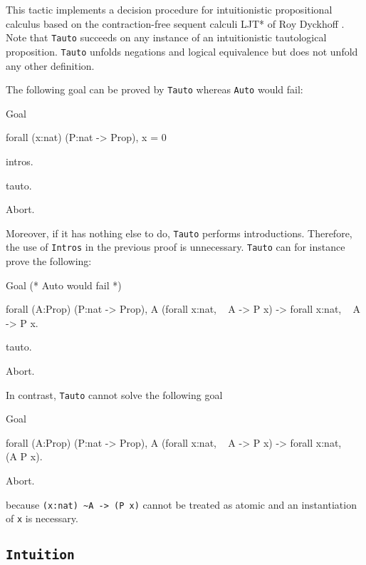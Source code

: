 This tactic implements a decision procedure for intuitionistic propositional
calculus based on the contraction-free sequent calculi LJT* of Roy Dyckhoff
\cite{Dyc92}. Note that {\tt Tauto} succeeds on any instance of an
intuitionistic tautological proposition. {\tt Tauto} unfolds negations
and logical equivalence but does not unfold any other definition.

The following goal can be proved by {\tt Tauto} whereas {\tt Auto}
would fail:

\begin{coq_example}
Goal

  forall (x:nat) (P:nat -> Prop), x = 0%

  intros.

  tauto.
\end{coq_example}
\begin{coq_eval}
Abort.
\end{coq_eval}

Moreover, if it has nothing else to do, {\tt Tauto} performs
introductions. Therefore, the use of {\tt Intros} in the previous
proof is unnecessary. {\tt Tauto} can for instance prove the
following:
\begin{coq_example}
Goal
 (* Auto would fail *)
  
  forall (A:Prop) (P:nat -> Prop),
    A \/ (forall x:nat, ~ A -> P x) -> forall x:nat, ~ A -> P x.

  tauto.
\end{coq_example}
\begin{coq_eval}
Abort.
\end{coq_eval}

\Rem In contrast, {\tt Tauto} cannot solve the following goal

\begin{coq_example*}
Goal

  forall (A:Prop) (P:nat -> Prop),
    A \/ (forall x:nat, ~ A -> P x) -> forall x:nat, ~ ~ (A \/ P x).
\end{coq_example*}
\begin{coq_eval}
Abort.
\end{coq_eval}

because \verb=(x:nat) ~A -> (P x)= cannot be treated as atomic and an
instantiation of \verb=x= is necessary.

\subsection{\tt Intuition {\tac}}
\label{Intuition}

